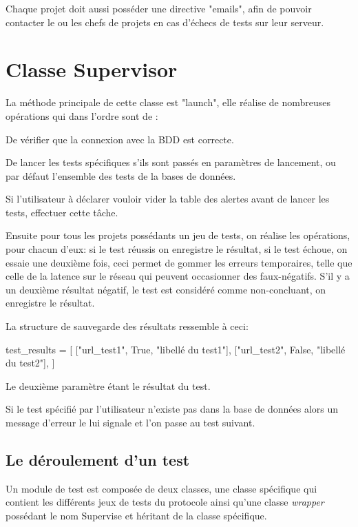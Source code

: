 Chaque projet doit aussi posséder une directive "emails", afin de pouvoir contacter le ou les chefs de projets en cas d'échecs de tests sur leur serveur.


\newpage

\section*{Classe Supervisor}

La méthode principale de cette classe est "launch", elle réalise de nombreuses opérations qui dans l'ordre sont de :

De vérifier que la connexion avec la BDD est correcte.

De lancer les tests spécifiques s'ils sont passés en paramètres de lancement, ou par défaut l'ensemble des tests de la bases de données.

Si l'utilisateur à déclarer vouloir vider la table des alertes avant de lancer les tests, effectuer cette tâche.

Ensuite pour tous les projets possédants un jeu de tests, on réalise les opérations, pour chacun d'eux: si le test réussis on enregistre le résultat, si le test échoue, on essaie une deuxième fois, ceci permet de gommer les erreurs temporaires, telle que celle de la latence sur le réseau qui peuvent occasionner des faux-négatifs. S'il y a un deuxième résultat négatif, le test est considéré comme non-concluant, on enregistre le résultat.

La structure de sauvegarde des résultats ressemble à ceci:
\begin{python}
test_results = [
	["url_test1", True, "libellé du test1"],
	["url_test2", False, "libellé du test2"],
]
\end{python}

Le deuxième paramètre étant le résultat du test.

Si le test spécifié par l'utilisateur n'existe pas dans la base de données alors un message d'erreur le lui signale et l'on passe au test suivant.

\subsection*{Le déroulement d'un test}

Un module de test est composée de deux classes, une classe spécifique qui contient les différents jeux de tests du protocole ainsi qu'une classe \textit{wrapper} possédant le nom Supervise et héritant de la classe spécifique.

